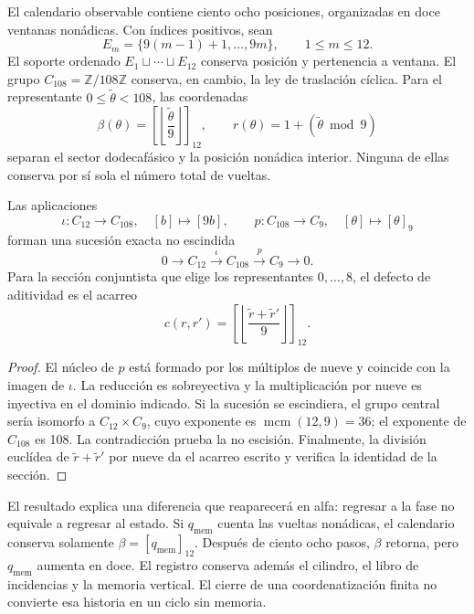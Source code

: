 El calendario observable contiene ciento ocho posiciones, organizadas en
doce ventanas nonádicas. Con índices positivos, sean
\[
 E_m=\{9(m-1)+1,\ldots,9m\},\qquad 1\leq m\leq12.
\]
El soporte ordenado \(E_1\sqcup\cdots\sqcup E_{12}\) conserva posición y
pertenencia a ventana. El grupo \(C_{108}=\mathbb Z/108\mathbb Z\)
conserva, en cambio, la ley de traslación cíclica. Para el representante
\(0\leq\widetilde\theta<108\), las coordenadas
\[
 \beta(\theta)=\left[\left\lfloor\frac{\widetilde\theta}{9}\right\rfloor\right]_{12},
 \qquad r(\theta)=1+(\widetilde\theta\bmod9)
\]
separan el sector dodecafásico y la posición nonádica interior. Ninguna de
ellas conserva por sí sola el número total de vueltas.

\begin{proposition}
\label{prop:k-extension}
Las aplicaciones
\[
 \iota:C_{12}\longrightarrow C_{108},\quad[b]\longmapsto[9b],
 \qquad p:C_{108}\longrightarrow C_9,\quad[\theta]\longmapsto[\theta]_9
\]
forman una sucesión exacta no escindida
\[
 0\longrightarrow C_{12}\xrightarrow{\iota}C_{108}
 \xrightarrow{p}C_9\longrightarrow0.
\]
Para la sección conjuntista que elige los representantes
\(0,\ldots,8\), el defecto de aditividad es el acarreo
\[
 c(r,r')=\left[\left\lfloor\frac{\widetilde r+\widetilde r'}9\right\rfloor\right]_{12}.
\]
\end{proposition}

\begin{proof}
El núcleo de \(p\) está formado por los múltiplos de nueve y coincide con
la imagen de \(\iota\). La reducción es sobreyectiva y la multiplicación
por nueve es inyectiva en el dominio indicado. Si la sucesión se
escindiera, el grupo central sería isomorfo a \(C_{12}\times C_9\), cuyo
exponente es \(\operatorname{mcm}(12,9)=36\); el exponente de
\(C_{108}\) es 108. La contradicción prueba la no escisión. Finalmente,
la división euclídea de \(\widetilde r+\widetilde r'\) por nueve da el
acarreo escrito y verifica la identidad de la sección.
\end{proof}

El resultado explica una diferencia que reaparecerá en alfa: regresar a la
fase no equivale a regresar al estado. Si \(q_{\mathrm{mem}}\) cuenta las
vueltas nonádicas, el calendario conserva solamente
\(\beta=[q_{\mathrm{mem}}]_{12}\). Después de ciento ocho pasos,
\(\beta\) retorna, pero \(q_{\mathrm{mem}}\) aumenta en doce. El
registro conserva además el cilindro, el libro de incidencias y la memoria
vertical. El cierre de una coordenatización finita no convierte esa historia en un
ciclo sin memoria.

